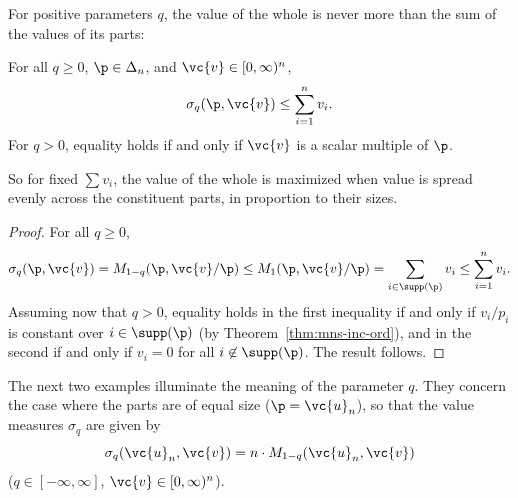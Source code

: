 For positive parameters $q$, the value of the whole is never more than the
sum of the values of its parts:

\begin{lemma}
For all $q \geq 0$, $\p \in \Delta_n$, and $\vc{v} \in [0, \infty)^n$,
\[
\sigma_q(\p, \vc{v}) \leq \sum_{i = 1}^n v_i.
\]
For $q > 0$, equality holds if and only if $\vc{v}$ is a scalar multiple of
$\p$.
\end{lemma}

So for fixed $\sum v_i$, the value of the whole is maximized when value
is spread evenly across the constituent parts, in proportion to their
sizes.

\begin{proof}
For all $q \geq 0$,
\[
\sigma_q(\p, \vc{v})    
=
M_{1 - q}(\p, \vc{v}/\p)        
\leq
M_1(\p, \vc{v}/\p) 
=
\sum_{i \in \supp(\p)} v_i      
\leq
\sum_{i = 1}^n v_i.
\]
Assuming now that $q > 0$, equality holds in the first inequality if and
only if $v_i/p_i$ is constant over $i \in \supp(\p)$ (by
Theorem~\ref{thm:mns-inc-ord}), and in the second if and only if $v_i = 0$
for all $i \not\in \supp(\p)$.  The result follows.
\end{proof}

The next two examples illuminate the meaning of the parameter $q$.
They concern the case where the parts are of equal size ($\p = \vc{u}_n$),
so that the value measures $\sigma_q$ are given by
\[
\sigma_q(\vc{u}_n, \vc{v}) = n \cdot M_{1 - q}(\vc{u}_n, \vc{v})
\]
($q \in [-\infty, \infty]$, $\vc{v} \in [0, \infty)^n$).  


